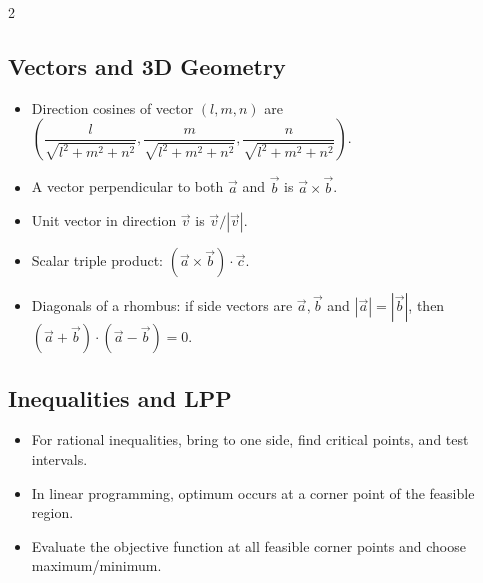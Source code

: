 \documentclass[11pt,a4paper]{article}
\begin{document}
\begin{multicols}{2}
\subsection*{Vectors and 3D Geometry}
\begin{itemize}[leftmargin=*]
\item Direction cosines of vector $(l,m,n)$ are
$\left(\dfrac{l}{\sqrt{l^2+m^2+n^2}},\dfrac{m}{\sqrt{l^2+m^2+n^2}},\dfrac{n}{\sqrt{l^2+m^2+n^2}}\right)$.
\item A vector perpendicular to both $\vec a$ and $\vec b$ is $\vec a\times\vec b$.
\item Unit vector in direction $\vec v$ is $\vec v/|\vec v|$.
\item Scalar triple product: $(\vec a\times\vec b)\cdot\vec c$.
\item Diagonals of a rhombus: if side vectors are $\vec a,\vec b$ and $|\vec a|=|\vec b|$, then $(\vec a+\vec b)\cdot(\vec a-\vec b)=0$.
\end{itemize}

\subsection*{Inequalities and LPP}
\begin{itemize}[leftmargin=*]
\item For rational inequalities, bring to one side, find critical points, and test intervals.
\item In linear programming, optimum occurs at a corner point of the feasible region.
\item Evaluate the objective function at all feasible corner points and choose maximum/minimum.
\end{itemize}
\end{multicols}
\end{document}
